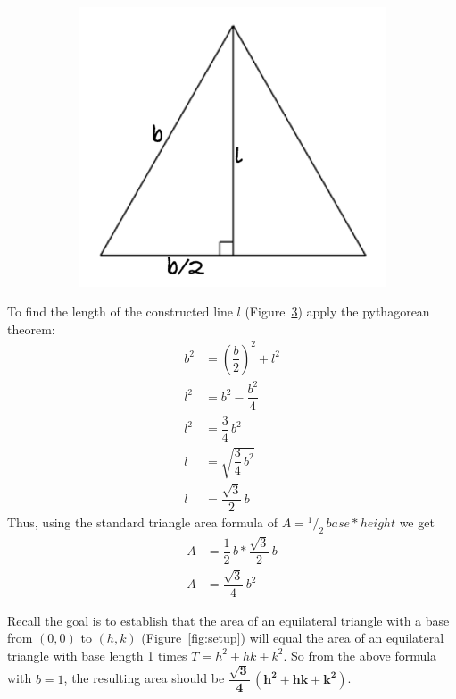 \documentclass[12pt,letter]{article}
\newcommand*\rfrac[2]{{}^{#1}\!/_{#2}}
\begin{document}
\begin{figure}[h]
\begin{subfigure}[h]{0.24\textwidth}
		\caption{}
		\label{fig:equil_tri_d}
	\end{subfigure}
	~
	\begin{subfigure}[h]{0.24\textwidth}
		\includegraphics[width=\textwidth]{equil_tri_e.pdf}
		\caption{}
		\label{fig:equil_tri_e}
	\end{subfigure}	
\end{figure}

To find the length of the constructed line $l$ (Figure~\ref{fig:equil_tri_e}) apply the pythagorean theorem:
\begin{align*}
b^2 &= \left(\dfrac{b} {2}\right)^2 + l^2 \\
l^2 &= b^2 - \dfrac{b^2} {4} \\
l^2 &= \dfrac{3} {4} \, b^2 \\
l &= \sqrt{\dfrac{3} {4} \, b^2} \\
l &= \dfrac{\sqrt{3}} {2} \, b
\end{align*}
%
Thus, using the standard triangle area formula of $A = \rfrac{1} {2} \, base * height$ we get
\begin{align*}
A &= \dfrac{1} {2} \, b * \dfrac{\sqrt{3}} {2} \, b \\
A &= \dfrac{\sqrt{3}} {4} \, b^2
\end{align*} 

Recall the goal is to establish that the area of an equilateral triangle with a base from $(0,0)$ to $(h,k)$ (Figure~\ref{fig:setup}) will equal the area of an equilateral triangle with base length 1 times $T = h^2 + hk + k^2$. So from the above formula with $b = 1$, the resulting area should be $\mathbf{ \dfrac{\sqrt{3}} {4} \, (h^2 + hk + k^2) }$. 
\end{document}
